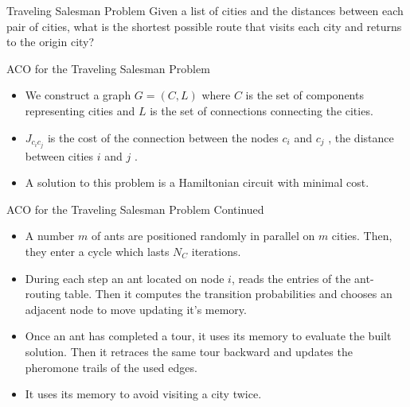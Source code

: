 \documentclass[table]{beamer}
\begin{document}
\begin{frame}{Traveling Salesman Problem}
	Given a list of cities and the distances between each pair of cities, what is the shortest possible route that visits each city and returns to the origin city?
\end{frame}

\begin{frame}{ACO for the Traveling Salesman Problem}
	
	\begin{itemize}
		\item We construct a graph $G = (C, L) $ where $C$ is the set of components 
			representing cities and $L$ is the set of connections connecting the cities.
		\item $ J_{c_ic_j} $ is the cost of the connection between the nodes $c_i $
		and $ c_j $ , the distance between cities $i$ and $j$ .
		
		\item A solution to this problem is a Hamiltonian circuit with minimal cost.
	\end{itemize}
\end{frame}

\begin{frame}{ACO for the Traveling Salesman Problem Continued}
	
	\begin{itemize}
		\item<1-> A number $m$ of ants are positioned randomly in parallel on $m$ 	cities. Then, they enter a cycle which lasts $ N_C $ iterations.
		
		\item<2-> During each step an ant located on node $i$, reads the entries
		of the ant-routing table. Then it computes the transition probabilities and chooses an adjacent node to move updating it's memory.
		
		\item <3-> Once an ant has completed a tour, it uses its memory to evaluate the built solution. Then it retraces the same tour backward and updates the  pheromone trails of the used edges.	
		
		\item <4-> It uses its memory to avoid visiting a city twice.	
	\end{itemize}
\end{frame}
\end{document}
